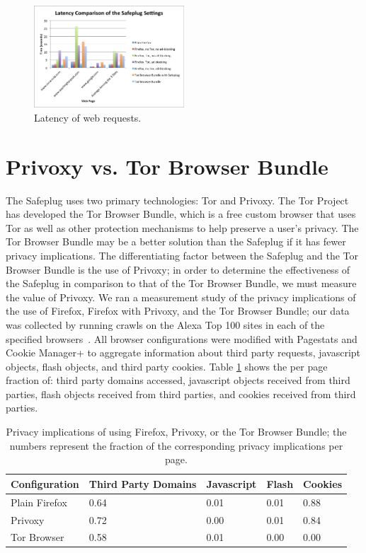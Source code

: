 \documentclass[letterpaper,twocolumn,10pt]{article}
\begin{document}
\begin{figure}
  \centering
  \includegraphics[width=0.5\textwidth]{latencygraph}
  \caption{Latency of web requests.}
  \label{fig:latency2}
\end{figure}

\section{Privoxy vs. Tor Browser Bundle}
The Safeplug uses two primary technologies: Tor and Privoxy.  The Tor Project has developed the Tor Browser Bundle, which is a free custom browser that uses Tor as well as other protection mechanisms to help preserve a user's privacy.  The Tor Browser Bundle may be a better solution than the Safeplug if it has fewer privacy implications.  The differentiating factor between the Safeplug and the Tor Browser Bundle is the use of Privoxy; in order to determine the effectiveness of the Safeplug in comparison to that of the Tor Browser Bundle, we must measure the value of Privoxy.  We ran a measurement study of the privacy implications of the use of Firefox, Firefox with Privoxy, and the Tor Browser Bundle; our data was collected by running crawls on the Alexa Top 100 sites in each of the specified browsers~\cite{alexa}.  All browser configurations were modified with Pagestats \cite{pagestats} and Cookie Manager+ \cite{cookiemonster} to aggregate information about third party requests, javascript objects, flash objects, and third party cookies.  Table \ref{tbb} shows the per page fraction of: third party domains accessed, javascript objects received from third parties, flash objects received from third parties, and cookies received from third parties.  

\begin{table}[!t]
\renewcommand{\arraystretch}{1.3}
\caption{Privacy implications of using Firefox, Privoxy, or the Tor Browser Bundle; the numbers represent the fraction of the corresponding privacy implications per page.}
\label{tbb}
\centering
\small
	\begin{tabular}{| p{1.85cm} | p{1.3cm} | p{1.25cm} | p{.7cm} | p{1cm} |}
	\hline
		Configuration & Third Party Domains & Javascript & Flash & Cookies \\ \hline
		Plain Firefox	& 0.64 & 0.01 & 0.01 & 0.88 \\ \hline
		Privoxy & 0.72 & 0.00 & 0.01 & 0.84 \\ \hline
		Tor Browser	& 0.58 & 0.01 & 0.00 & 0.00 \\ \hline
	\end{tabular}
\end{table}
\end{document}
